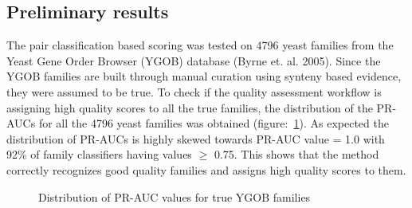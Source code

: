 \documentclass{article}
\begin{document}
		\subsection{Preliminary results}
		The pair classification based scoring was tested on 4796 yeast families from the Yeast Gene Order Browser (YGOB) database (Byrne et. al. 2005). Since the YGOB families are built through manual curation using synteny based evidence, they were assumed to be true. To check if the quality assessment workflow is assigning high quality scores to all the true families, the distribution of the PR-AUCs for all the 4796 yeast families was obtained (figure:~\ref{fig:hist_pr-auc_true_ygob}). As expected the distribution of PR-AUCs is highly skewed towards PR-AUC value = 1.0 with 92\% of family classifiers having values $\geq$ 0.75. This shows that the method correctly recognizes good quality families and assigns high quality scores to them.
		
		\begin{figure}
			\caption{Distribution of PR-AUC values for true YGOB families}
			\label{fig:hist_pr-auc_true_ygob}
		\end{figure}
		
\end{document}

